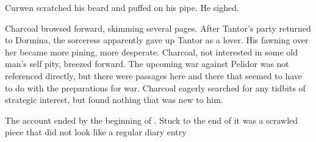\noindent
% 
% 
% 

Curwen scratched his beard and puffed on his pipe. 
He sighed. 

Charcoal browsed forward, skimming several pages. 
% 
After Tantor's party returned to Dormina, the sorceress apparently gave up Tantor as a lover. 
His fawning over her became more pining, more desperate. 
Charcoal, not interested in some old man's self pity, breezed forward. 
The upcoming war against Pelidor was not referenced directly, but there were passages here and there that seemed to have to do with the preparations for war. 
Charcoal eagerly searched for any tidbits of strategic interest, but found nothing that was new to him. 

The account ended by the beginning of \Gamishiel. 
Stuck to the end of it was a scrawled piece that did not look like a regular diary entry\prikker 









